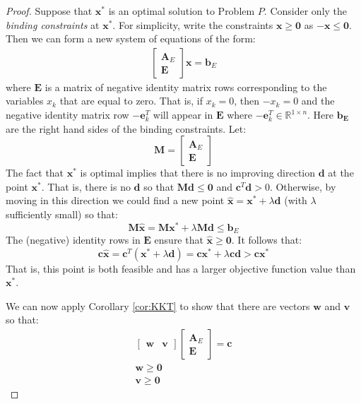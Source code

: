 \begin{proof} Suppose that $\mathbf{x}^*$ is an optimal solution to Problem $P$. Consider only the \textit{binding constraints} at $\mathbf{x}^*$. For simplicity, write the constraints $\mathbf{x} \geq \mathbf{0}$ as $-\mathbf{x} \leq \mathbf{0}$. Then we can form a new system of equations of the form:
\begin{align}
\begin{bmatrix} \mathbf{A}_E \\ \mathbf{E} \end{bmatrix} \mathbf{x} = \mathbf{b}_E
\end{align}
where $\mathbf{E}$ is a matrix of negative identity matrix rows corresponding to the variables $x_k$ that are equal to zero. That is, if $x_k = 0$, then $-x_k = 0$ and the negative identity matrix row $-\mathbf{e}^T_k$ will appear in $\mathbf{E}$ where $-\mathbf{e}^T_k \in \mathbb{R}^{1 \times n}$. Here $\mathbf{b}_\mathbf{E}$ are the right hand sides of the binding constraints. Let:
\begin{displaymath}
\mathbf{M} = \begin{bmatrix}
\mathbf{A}_E\\
\mathbf{E}
\end{bmatrix}
\end{displaymath}
The fact that $\mathbf{x}^*$ is optimal implies that there is no improving direction $\mathbf{d}$ at the point $\mathbf{x}^*$. That is, there is no $\mathbf{d}$ so that $\mathbf{M}\mathbf{d} \leq \mathbf{0}$ and $\mathbf{c}^T\mathbf{d} > 0$. Otherwise, by moving in this direction we could find a new point $\hat{\mathbf{x}} = \mathbf{x}^* + \lambda\mathbf{d}$ (with $\lambda$ sufficiently small) so that:
\begin{displaymath}
\mathbf{M}\hat{\mathbf{x}} = \mathbf{M}\mathbf{x}^* + \lambda \mathbf{M}\mathbf{d} \leq \mathbf{b}_E
\end{displaymath}
The (negative) identity rows in $\mathbf{E}$ ensure that $\hat{\mathbf{x}} \geq \mathbf{0}$. 
It follows that:
\begin{displaymath}
\mathbf{c}\hat{\mathbf{x}} = \mathbf{c}^T\left( \mathbf{x}^* + \lambda\mathbf{d}\right) = \mathbf{c}\mathbf{x}^* + \lambda\mathbf{c}\mathbf{d} > \mathbf{c}\mathbf{x}^*
\end{displaymath}
That is, this point is both feasible and has a larger objective function value than $\mathbf{x}^*$. 

We can now apply Corollary \ref{cor:KKT} to show that there are vectors $\mathbf{w}$ and $\mathbf{v}$ so that:
\begin{align}
\begin{bmatrix}\mathbf{w} & \mathbf{v}\end{bmatrix}
\begin{bmatrix}
\mathbf{A}_E \\
\mathbf{E}\label{eqn:DualFeas1}
\end{bmatrix} = \mathbf{c}\\
\mathbf{w} \geq \mathbf{0}\\
\mathbf{v} \geq \mathbf{0}
\end{align}


\end{proof}
